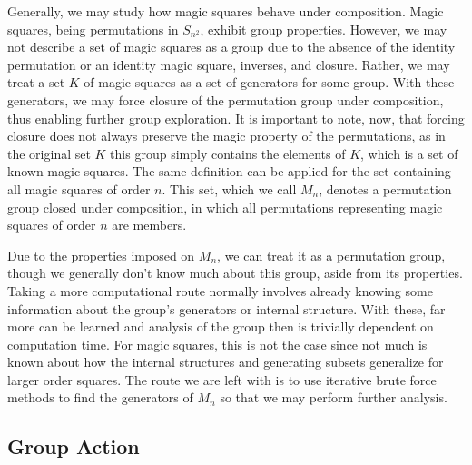 \documentclass{rhumj_new}
\begin{document}


Generally, we may study how magic squares behave under composition. Magic squares, being
permutations in $S_{n^2}$, exhibit group properties. However, we may not describe a set of magic
squares as a group due to the absence of the identity permutation or an identity magic square,
inverses, and closure. Rather, we may treat a set $K$ of magic squares as a set of generators for
some group. With these generators, we may force closure of the permutation group under composition,
thus enabling further group exploration. It is important to note, now, that forcing closure does
not always preserve the magic property of the permutations, as in the original set $K$
\textemdash{}
this group simply contains the elements of $K$, which is a set of known magic squares. The same
definition can be applied for the set containing all magic squares of order $n$. This set, which we
call $M_n$, denotes a permutation group closed under composition, in which all permutations
representing magic squares of order $n$ are members.

Due to the properties imposed on $M_n$, we can treat it as a permutation group, though we
generally don't know much about this group, aside from its properties. Taking a more computational
route normally involves already knowing some information about the group's generators or internal
structure. With these, far more can be learned and analysis of the group then is trivially
dependent on computation time. For magic squares, this is not the case since not much is known
about how the internal structures and generating subsets generalize for larger order squares. The
route we are left with is to use iterative brute force methods to find the generators of $M_n$ so
that we may perform further analysis.

\subsection{Group Action}
\end{document}
